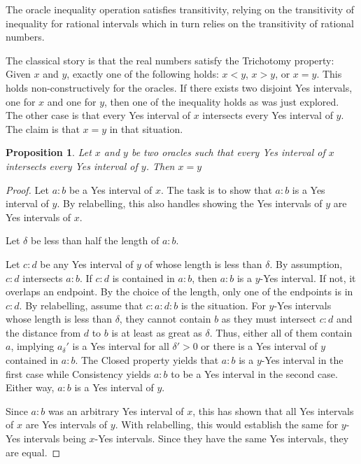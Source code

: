 \documentclass[12pt]{article}
\newtheorem{proposition}{Proposition}[section]
\begin{document}
The oracle inequality operation satisfies transitivity, relying on the transitivity of inequality for rational intervals which in turn relies on the transitivity of rational numbers. 

The classical story is that the real numbers satisfy the Trichotomy property: Given $x$ and $y$, exactly one of the following holds: $x<y$, $x>y$, or $x=y$. This holds non-constructively for the oracles. If there exists two disjoint Yes intervals, one for $x$ and one for $y$, then one of the inequality holds as was just explored. The other case is that every Yes interval of $x$ intersects every Yes interval of $y$. The claim is that $x=y$ in that situation. 

\begin{proposition}
    Let $x$ and $y$ be two oracles such that every Yes interval of $x$ intersects every Yes interval of $y$. Then $x=y$
\end{proposition}

\begin{proof}
    Let $a:b$ be a Yes interval of $x$. The task is to show that $a:b$ is a Yes interval of $y$. By relabelling, this also handles showing the Yes intervals of $y$ are Yes intervals of $x$.

    Let $\delta$ be less than half the length of $a:b$.

    Let $c:d$ be any Yes interval of $y$ of whose length is less than $\delta$. By assumption, $c:d$ intersects $a:b$. If $c:d$ is contained in $a:b$, then $a:b$ is a $y$-Yes interval. If not, it overlaps an endpoint. By the choice of the length, only one of the endpoints is in $c:d$. By relabelling, assume that $c:a:d:b$ is the situation. For $y$-Yes intervals whose length is less than $\delta$, they cannot contain $b$ as they must intersect $c:d$ and the distance from $d$ to $b$ is at least as great as $\delta$. Thus, either all of them contain $a$, implying $a_\delta'$ is a Yes interval for all $\delta' > 0$ or there is a Yes interval of $y$ contained in $a:b$. The Closed property yields that $a:b$ is a $y$-Yes interval in the first case while Consistency yields $a:b$ to be a Yes interval in the second case. Either way, $a:b$ is a Yes interval of $y$.

    Since $a:b$ was an arbitrary Yes interval of $x$, this has shown that all Yes intervals of $x$ are Yes intervals of $y$. With relabelling, this would establish the same for $y$-Yes intervals being $x$-Yes intervals. Since they have the same Yes intervals, they are equal. 
\end{proof}
\end{document}
